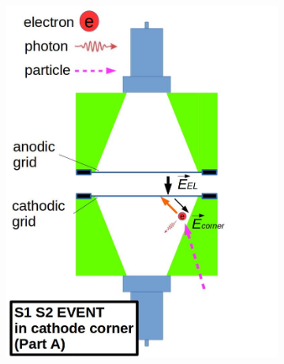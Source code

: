 \begin{figure}[!htbp]
	\centering
	\begin{subfigure}[b]{0.8\textwidth}
		\centering
		\includegraphics[width=\halfwidth,clip,trim={0 0 0 0},angle=0,origin=c]{Figures/GasTest/WeiDrawEvent/S1S2A.jpg}

\end{subfigure}
\end{figure}
